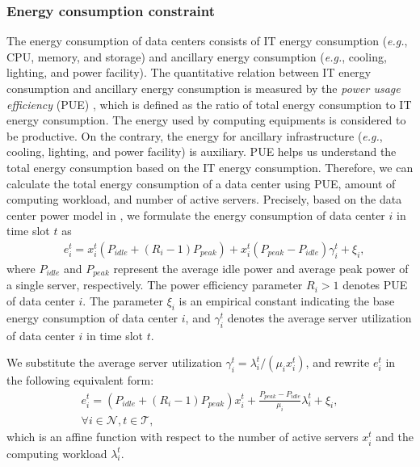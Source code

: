 \documentclass[journal]{IEEEtran}
\begin{document}
	\subsubsection{Energy consumption constraint}
	The energy consumption of data centers consists of IT energy consumption (\emph{e.g.}, CPU, memory, and storage) and ancillary energy consumption (\emph{e.g.}, cooling, lighting, and power facility). The quantitative relation between IT energy consumption and ancillary energy consumption is measured by the \textit{power usage efficiency} (PUE) \cite{pue}, which is defined as the ratio of total energy consumption to IT energy consumption. The energy used by computing equipments is considered to be productive. On the contrary, the energy for ancillary infrastructure (\emph{e.g.}, cooling, lighting, and power facility) is auxiliary. PUE helps us understand the total energy consumption based on the IT energy consumption. Therefore, we can calculate the total energy consumption of a data center using PUE, amount of computing workload, and number of active servers. Precisely, based on the data center power model in \cite{coordinate}, we formulate the energy consumption of data center $i$ in time slot $t$ as
	\begin{align*}
		& e_{i}^{t} = x_{i}^{t} \left( P_{idle} + (R_{i} -1)  P_{peak} \right)+ x_{i}^{t} (P_{peak}-P_{idle}) \gamma_{i}^{t} + \xi_i,
	\end{align*}
	where $P_{idle}$ and $P_{peak}$ represent the average idle power and average peak power of a single server, respectively. The power efficiency parameter $R_{i} > 1$ denotes PUE of data center $i$. The parameter $\xi_i$ is an empirical constant indicating the base energy consumption of data center $i$, and $\gamma_{i}^{t}$ denotes the average server utilization of data center $i$ in time slot $t$. 
	
	We substitute the average server utilization $\gamma_{i}^{t}=\lambda_{i}^{t} / (\mu_i x_{i}^{t})$, and rewrite $e_i^t$ in the following equivalent form:
	\begin{equation}\label{energycon}
	  \begin{split}
     e_{i}^{t} =  \left( P_{idle} + (R_{i} -1)  P_{peak} \right) x_{i}^{t}   
      + \frac{P_{peak}-P_{idle}}{\mu_i} \lambda_{i}^{t} + \xi_i , \\
    \forall i \in \mathcal{N}, t \in \mathcal{T}, 
	  \end{split}
	\end{equation}
	which is an affine function with respect to the number of active servers $x_{i}^{t}$ and the computing workload $\lambda_{i}^{t}$.
		
\end{document}
